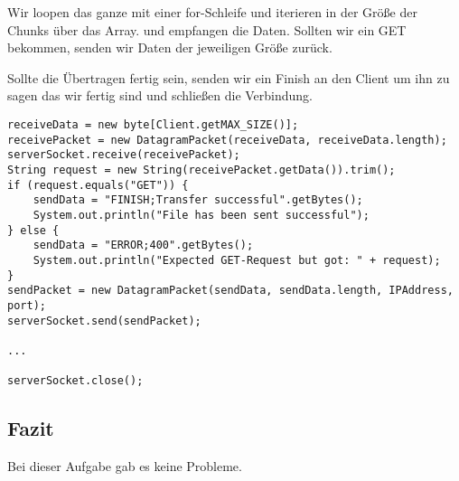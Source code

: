 Wir loopen das ganze mit einer for-Schleife und iterieren in der Größe der Chunks über das Array. und empfangen die Daten. Sollten wir ein GET bekommen, senden wir Daten der jeweiligen Größe zurück. 

Sollte die Übertragen fertig sein, senden wir ein Finish an den Client um ihn zu sagen das wir fertig sind und schließen die Verbindung.

\begin{lstlisting}
receiveData = new byte[Client.getMAX_SIZE()];
receivePacket = new DatagramPacket(receiveData, receiveData.length);
serverSocket.receive(receivePacket);
String request = new String(receivePacket.getData()).trim();
if (request.equals("GET")) {
	sendData = "FINISH;Transfer successful".getBytes();
	System.out.println("File has been sent successful");
} else {
    sendData = "ERROR;400".getBytes();
	System.out.println("Expected GET-Request but got: " + request);
}
sendPacket = new DatagramPacket(sendData, sendData.length, IPAddress, port);
serverSocket.send(sendPacket);
           	
...

serverSocket.close();
\end{lstlisting}

\subsection{Fazit}
Bei dieser Aufgabe gab es keine Probleme.